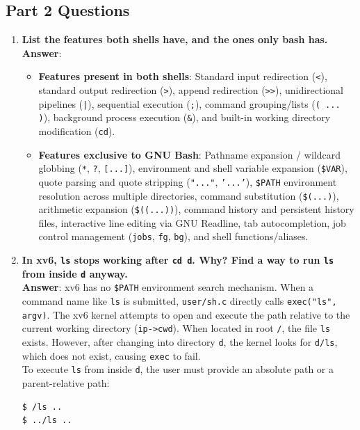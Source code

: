 \documentclass[12pt,a4paper]{article}
\begin{document}
\subsection{Part 2 Questions}
\begin{enumerate}
    \item \textbf{List the features both shells have, and the ones only bash has.} \\
    \textbf{Answer}:
    \begin{itemize}
        \item \textbf{Features present in both shells}: Standard input redirection (\texttt{<}), standard output redirection (\texttt{>}), append redirection (\texttt{>>}), unidirectional pipelines (\texttt{|}), sequential execution (\texttt{;}), command grouping/lists (\texttt{( ... )}), background process execution (\texttt{\&}), and built-in working directory modification (\texttt{cd}).
        \item \textbf{Features exclusive to GNU Bash}: Pathname expansion / wildcard globbing (\texttt{*}, \texttt{?}, \texttt{[...]}), environment and shell variable expansion (\texttt{\$VAR}), quote parsing and quote stripping (\texttt{"..."}, \texttt{'...'}), \texttt{\$PATH} environment resolution across multiple directories, command substitution (\texttt{\$(...)}), arithmetic expansion (\texttt{\$((...))}), command history and persistent history files, interactive line editing via GNU Readline, tab autocompletion, job control management (\texttt{jobs}, \texttt{fg}, \texttt{bg}), and shell functions/aliases.
    \end{itemize}

    \item \textbf{In xv6, \texttt{ls} stops working after \texttt{cd d}. Why? Find a way to run \texttt{ls} from inside \texttt{d} anyway.} \\
    \textbf{Answer}: xv6 has no \texttt{\$PATH} environment search mechanism. When a command name like \texttt{ls} is submitted, \texttt{user/sh.c} directly calls \texttt{exec("ls", argv)}. The xv6 kernel attempts to open and execute the path relative to the current working directory (\texttt{ip->cwd}). When located in root \texttt{/}, the file \texttt{ls} exists. However, after changing into directory \texttt{d}, the kernel looks for \texttt{d/ls}, which does not exist, causing \texttt{exec} to fail. \\
    To execute \texttt{ls} from inside \texttt{d}, the user must provide an absolute path or a parent-relative path:
\begin{lstlisting}[style=consolestyle]
$ /ls ..
$ ../ls ..
\end{lstlisting}


\end{enumerate}
\end{document}
